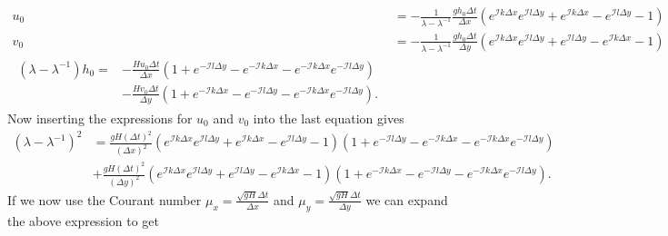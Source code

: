 \begin{subequations}
\begin{align*}
u_0 &= -\frac{1}{\lambda - \lambda^{-1}} \frac{g h_0 \Delta t}{\Delta x} \left(e^{\mathcal{I}k \Delta x}e^{\mathcal{I}l \Delta y}+ e^{\mathcal{I}k\Delta x} - e^{\mathcal{I}l \Delta y}-1\right) \\
v_0 &= -\frac{1}{\lambda - \lambda^{-1}} \frac{gh_0\Delta t}{\Delta y} \left(e^{\mathcal{I}k \Delta x}e^{\mathcal{I}l \Delta y}+ e^{\mathcal{I}l\Delta y} - e^{\mathcal{I}k \Delta x}-1\right) \\
\begin{split}
    \left(\lambda - \lambda^{-1}\right) h_0 = &- \frac{Hu_0\Delta t}{\Delta x}  \left(1+e^{-\mathcal{I}l \Delta y} - e^{-\mathcal{I}k \Delta x}- e^{-\mathcal{I}k \Delta x}e^{-\mathcal{I}l \Delta y}\right)  \\ 
    &- \frac{Hv_0\Delta t}{\Delta y}\left(1+e^{-\mathcal{I}k \Delta x} - e^{-\mathcal{I}l \Delta y}- e^{-\mathcal{I}k \Delta x}e^{-\mathcal{I}l \Delta y}\right).
\end{split}
\end{align*}
\end{subequations}
Now inserting the expressions for $u_0$ and $v_0$ into the last equation gives
\begin{equation*}
    \begin{split}
    \left(\lambda - \lambda^{-1}\right)^2 &= \frac{gH\left(\Delta t\right)^2}{\left(\Delta x\right)^2} \left(e^{\mathcal{I}k \Delta x}e^{\mathcal{I}l \Delta y}+ e^{\mathcal{I}k\Delta x} - e^{\mathcal{I}l \Delta y}-1\right)\left(1+e^{-\mathcal{I}l \Delta y} - e^{-\mathcal{I}k \Delta x}- e^{-\mathcal{I}k \Delta x}e^{-\mathcal{I}l \Delta y}\right) \\ 
    &
    + \frac{gH\left(\Delta t\right)^2}{\left(\Delta y\right)^2} \left(e^{\mathcal{I}k \Delta x}e^{\mathcal{I}l \Delta y}+ e^{\mathcal{I}l\Delta y} - e^{\mathcal{I}k \Delta x}-1\right)\left(1+e^{-\mathcal{I}k \Delta x} - e^{-\mathcal{I}l \Delta y}- e^{-\mathcal{I}k \Delta x}e^{-\mathcal{I}l \Delta y}\right).
    \end{split}
\end{equation*}
If we now use the Courant number $\mu_x = \tfrac{\sqrt{gH}\Delta t}{\Delta x}$ and $\mu_y = \tfrac{\sqrt{gH}\Delta t}{\Delta y}$ we can expand the above expression to get
